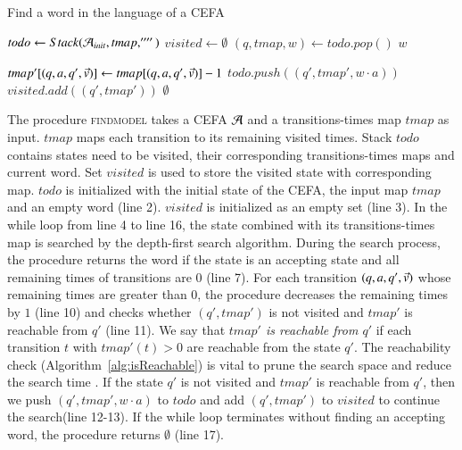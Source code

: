 \begin{algorithm}[H]
  \caption{Find a word in the language of a CEFA}\label{alg:findword}
  \begin{algorithmic}[1]
      \State $todo \gets Stack(\mathcal{A}_{init}, tmap, '''')$
      \State $visited \gets \emptyset$
        \State $(q, tmap, w) \gets todo.pop()$
          \State \Return $w$
        \EndIf
        
          \State $tmap'[(q, a, q', \vec{v})] \gets tmap[(q, a, q', \vec{v})] - 1$
            \State $todo.push((q', tmap', w\cdot a))$
            \State $visited.add((q', tmap'))$
          \EndIf
        \EndFor
      \EndWhile
      \State \Return $\emptyset$ 
  \EndProcedure
  \end{algorithmic}
  \end{algorithm}

  The procedure \textsc{findmodel} takes a CEFA $\mathcal{A}$ and a transitions-times map $tmap$ as input. $tmap$ maps each transition to its remaining visited times. Stack $todo$ contains states need to be visited, their corresponding transitions-times maps and current word. Set $visited$ is used to store the visited state with corresponding map. $todo$ is initialized with the initial state of the CEFA, the input map $tmap$ and an empty word (line 2). $visited$ is initialized as an empty set (line 3).
  In the while loop from line 4 to line 16, the state combined with its transitions-times map is searched by the depth-first search algorithm. During the search process, the procedure returns the word if the state is an accepting state and all remaining times of transitions are $0$ (line 7). For each transition $(q, a, q', \vec{v})$ whose remaining times are greater than $0$, the procedure decreases the remaining times by $1$ (line 10) and checks whether $(q', tmap')$ is not visited and $tmap'$ is reachable from $q'$ (line 11). We say that \textit{$tmap'$ is reachable from $q'$} if each transition $t$ with $tmap'(t)> 0$ are reachable from the state $q'$. The reachability check (Algorithm~\ref{alg:isReachable}) is vital to prune the search space and reduce the search time . If the state $q'$ is not visited and $tmap'$ is reachable from $q'$, then we push $(q', tmap', w\cdot a)$ to $todo$ and add $(q', tmap')$ to $visited$ to continue the search(line 12-13). If the while loop terminates without finding an accepting word, the procedure returns $\emptyset$ (line 17).  
  
